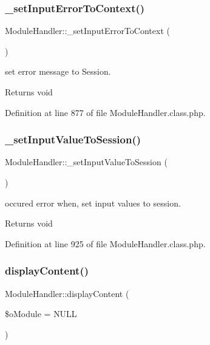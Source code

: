 \subsubsection{\texorpdfstring{\+\_\+set\+Input\+Error\+To\+Context()}{\_setInputErrorToContext()}}
{\footnotesize\ttfamily Module\+Handler\+::\+\_\+set\+Input\+Error\+To\+Context (\begin{DoxyParamCaption}{ }\end{DoxyParamCaption})}

set error message to Session. \begin{DoxyReturn}{Returns}
void 
\end{DoxyReturn}


Definition at line 877 of file Module\+Handler.\+class.\+php.

\hypertarget{classModuleHandler_ab3837506079a320e2726079777bb2b3e}{}\label{classModuleHandler_ab3837506079a320e2726079777bb2b3e} 
\subsubsection{\texorpdfstring{\+\_\+set\+Input\+Value\+To\+Session()}{\_setInputValueToSession()}}
{\footnotesize\ttfamily Module\+Handler\+::\+\_\+set\+Input\+Value\+To\+Session (\begin{DoxyParamCaption}{ }\end{DoxyParamCaption})}

occured error when, set input values to session. \begin{DoxyReturn}{Returns}
void 
\end{DoxyReturn}


Definition at line 925 of file Module\+Handler.\+class.\+php.

\hypertarget{classModuleHandler_a140c43faf30dedf139212294e3e9acf3}{}\label{classModuleHandler_a140c43faf30dedf139212294e3e9acf3} 
\subsubsection{\texorpdfstring{display\+Content()}{displayContent()}}
{\footnotesize\ttfamily Module\+Handler\+::display\+Content (\begin{DoxyParamCaption}\item[{}]{\$o\+Module = {\ttfamily NULL} }\end{DoxyParamCaption})}

